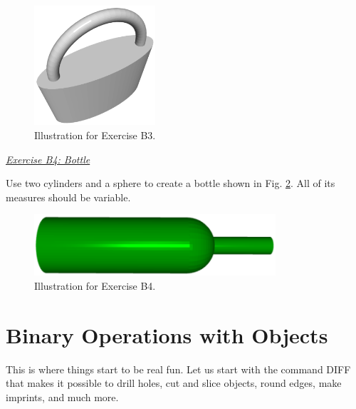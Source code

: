 \documentclass[article,A4,12pt]{llncs}
\begin{document}
\newpage

\begin{figure}[!ht]
\begin{center}
\includegraphics[width=0.4\textwidth]{img/padlock.png}
\end{center}
\vspace{-2mm}
\caption{Illustration for Exercise B3.}
\label{fig:b3}
\end{figure}
\noindent
\underline{\em Exercise B4: Bottle}

Use two cylinders and a sphere to create a bottle shown in Fig. \ref{fig:b4}. 
All of its measures should be variable.

\begin{figure}[!ht]
\begin{center}
\includegraphics[width=0.8\textwidth]{img/bottle.png}
\end{center}
\vspace{-2mm}
\caption{Illustration for Exercise B4.}
\label{fig:b4}
\end{figure}






\section{Binary Operations with Objects}

This is where things start to be real fun. Let us start with the 
command DIFF that makes it possible to drill holes, cut and slice objects, 
round edges, make imprints, and much more.
\end{document}
